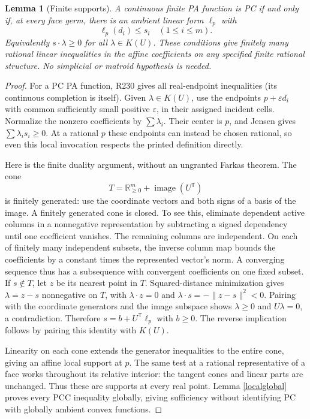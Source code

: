 \documentclass[11pt]{article}
\newtheorem{lemma}[theorem]{Lemma}
\newcommand{\R}{\mathbb R}
\begin{document}
\begin{lemma}[Finite supports]\label{supports}
A continuous finite PA function is PC if and only if, at every face
germ, there is an ambient linear form \(\ell_p\) with
\[
 \ell_p(d_i)\leq s_i\quad(1\leq i\leq m).
\]
Equivalently \(s\cdot\lambda\geq0\) for all \(\lambda\in K(U)\).
These conditions give finitely many rational linear inequalities in the
affine coefficients on any specified finite rational structure. No
simplicial or matroid hypothesis is needed.
\end{lemma}
\begin{proof}
For a PC PA function, R230 gives all real-endpoint inequalities (its
continuous completion is itself). Given \(\lambda\in K(U)\), use the
endpoints \(p+\varepsilon d_i\) with common sufficiently small positive
\(\varepsilon\), in their assigned incident cells. Normalize the nonzero
coefficients by \(\sum\lambda_i\). Their center is \(p\), and Jensen gives
\(\sum\lambda_i s_i\geq0\). At a rational \(p\) these endpoints can instead
be chosen rational, so even this local invocation respects the printed
definition directly.

Here is the finite duality argument, without an ungranted Farkas theorem.
The cone
\[
 T=\R_{\geq0}^m+\operatorname{image}(U^\mathsf{T})
\]
is finitely generated: use the coordinate vectors and both signs of a
basis of the image. A finitely generated cone is closed. To see this,
eliminate dependent active columns in a nonnegative representation by
subtracting a signed dependency until one coefficient vanishes. The
remaining columns are independent. On each of finitely many independent
subsets, the inverse column map bounds the coefficients by a constant
times the represented vector's norm. A converging sequence thus has a
subsequence with convergent coefficients on one fixed subset.
If \(s\notin T\), let \(z\) be its nearest point in \(T\). Squared-distance
minimization gives \(\lambda=z-s\) nonnegative on \(T\), with
\(\lambda\cdot z=0\) and
\(\lambda\cdot s=-\|z-s\|^2<0\). Pairing with the coordinate generators
and the image subspace shows \(\lambda\geq0\) and \(U\lambda=0\), a
contradiction. Therefore \(s=b+U^\mathsf{T}\ell_p\) with \(b\geq0\).
The reverse implication follows by pairing this identity with \(K(U)\).

Linearity on each cone extends the generator inequalities to the entire
cone, giving an affine local support at \(p\). The same test at a
rational representative of a face works throughout its relative interior:
the tangent cones and linear parts are unchanged. Thus these are supports
at every real point. Lemma \ref{localglobal} proves every
PCC inequality globally, giving sufficiency without identifying PC with
globally ambient convex functions.


\end{proof}
\end{document}
